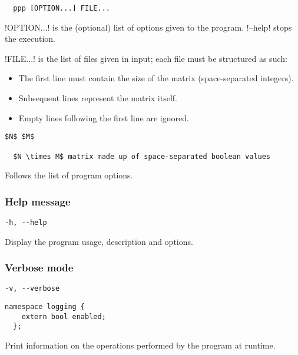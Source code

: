 \begin{lstlisting}
  ppp [OPTION...] FILE...
\end{lstlisting}

!OPTION...! is the (optional) list of options given to the program.
!--help! stops the execution.

!FILE...! is the list of files given in input; each file must be structured as such:

\begin{itemize}
  \item The first line must contain the size of the matrix (space-separated integers).

  \item Subsequent lines represent the matrix itself.

  \item Empty lines following the first line are ignored.
\end{itemize}

\begin{lstlisting}[aboveskip=0pt]
  $N$ $M$

  $N \times M$ matrix made up of space-separated boolean values
\end{lstlisting}

Follows the list of program options.

\subsubsection*{Help message}

\begin{lstlisting}[aboveskip=\smallskipamount]
  -h, --help
\end{lstlisting}

Display the program usage, description and options.

\subsubsection*{Verbose mode}

\begin{lstlisting}[aboveskip=\smallskipamount]
  -v, --verbose
\end{lstlisting}

\begin{lstlisting}[style=c++_block, aboveskip=\smallskipamount]
  namespace logging {
    extern bool enabled;
  };
\end{lstlisting}

Print information on the operations performed by the program at runtime.


